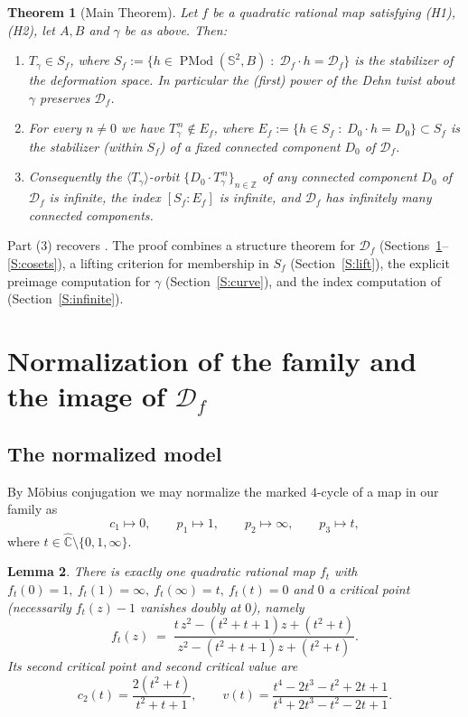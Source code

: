 \documentclass[11pt]{amsart}
\newtheorem{theorem}{Theorem}[section]
\newtheorem{lemma}[theorem]{Lemma}
\newcommand{\Sph}{\mathbb{S}^{2}}
\newcommand{\Cpt}{\widehat{\mathbb{C}}}
\newcommand{\PMod}{\operatorname{PMod}}
\newcommand{\Def}{\mathcal{D}}
\begin{document}
\begin{theorem}[Main Theorem]\label{T:main}
Let $f$ be a quadratic rational map satisfying {\rm (H1)}, {\rm (H2)}, let
$A,B$ and $\gamma$ be as above. Then:
\begin{enumerate}
\item $T_\gamma\in S_f$, where
$S_f:=\{h\in\PMod(\Sph,B)\;:\;\Def_f\cdot h=\Def_f\}$ is the stabilizer of
the deformation space. In particular the (first) power of the Dehn twist
about $\gamma$ preserves $\Def_f$.
\item For every $n\neq 0$ we have $T_\gamma^{\,n}\notin E_f$, where
$E_f:=\{h\in S_f\;:\;D_0\cdot h=D_0\}\subset S_f$ is the stabilizer (within
$S_f$) of a fixed connected component $D_0$ of $\Def_f$.
\item Consequently the $\langle T_\gamma\rangle$-orbit
$\{D_0\cdot T_\gamma^{\,n}\}_{n\in\mathbb{Z}}$ of any connected component
$D_0$ of $\Def_f$ is infinite, the index $[S_f:E_f]$ is infinite, and
$\Def_f$ has infinitely many connected components.
\end{enumerate}
\end{theorem}

Part (3) recovers \cite[Thm.~1.3]{Luo}. The proof combines a structure
theorem for $\Def_f$ (Sections~\ref{S:structure}--\ref{S:cosets}), a lifting
criterion for membership in $S_f$ (Section~\ref{S:lift}), the explicit
preimage computation for $\gamma$ (Section~\ref{S:curve}), and the index
computation of \cite{Luo} (Section~\ref{S:infinite}).

\section{Normalization of the family and the image of $\Def_f$}
\label{S:structure}

\subsection{The normalized model}
By Möbius conjugation we may normalize the marked $4$-cycle of a map in our
family as
\[
c_1\mapsto 0,\qquad p_1\mapsto 1,\qquad p_2\mapsto\infty,\qquad
p_3\mapsto t ,
\]
where $t\in\Cpt\setminus\{0,1,\infty\}$.

\begin{lemma}\label{L:family}
There is exactly one quadratic rational map $f_t$ with
$f_t(0)=1,\ f_t(1)=\infty,\ f_t(\infty)=t,\ f_t(t)=0$ and $0$ a critical
point (necessarily $f_t(z)-1$ vanishes doubly at $0$), namely
\[
f_t(z)\;=\;\frac{t\,z^2-(t^2+t+1)z+(t^2+t)}
{z^2-(t^2+t+1)z+(t^2+t)} .
\]
Its second critical point and second critical value are
\[
c_2(t)=\frac{2(t^2+t)}{t^2+t+1},
\qquad
v(t)=\frac{t^4-2t^3-t^2+2t+1}{t^4+2t^3-t^2-2t+1}.
\]
\end{lemma}
\end{document}
